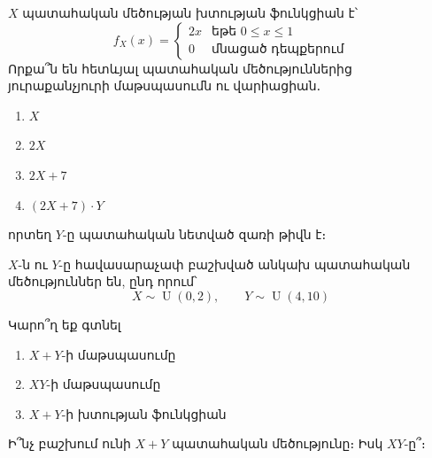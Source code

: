 \begin{problem}
$X$ պատահական մեծության խտության ֆունկցիան է՝
\[
f_X(x) = \begin{cases}
   2x & \text{եթե } 0 \le x \le 1 \\
   0 & \text{մնացած դեպքերում} 
\end{cases}
\]
Որքա՞ն են հետևյալ պատահական մեծություններից յուրաքանչյուրի մաթսպասումն ու վարիացիան․
\begin{enumerate}[label={\alph*}․]
\item $X$
\item $2X$
\item $2X + 7$
\item $(2X + 7)\cdot Y$
\end{enumerate}
որտեղ $Y$-ը պատահական նետված զառի թիվն է։
\end{problem}


\begin{problem}
$X$-ն ու $Y$-ը հավասարաչափ բաշխված անկախ պա\-տա\-հա\-կան մեծություններ են, ընդ որում՝
\[
X \sim \operatorname{U}(0, 2), 
\qquad
Y \sim \operatorname{U}(4, 10)
\]

\newpage

Կարո՞ղ եք գտնել
\begin{enumerate}[label={\alph*}․]
\item $X + Y$-ի մաթսպասումը
\item $XY$-ի մաթսպասումը
\item $X + Y$-ի խտության ֆունկցիան
\end{enumerate}

Ի՞նչ բաշխում ունի $X + Y$ պատահական մեծությունը։ Իսկ $XY$-ը՞։
\end{problem}
